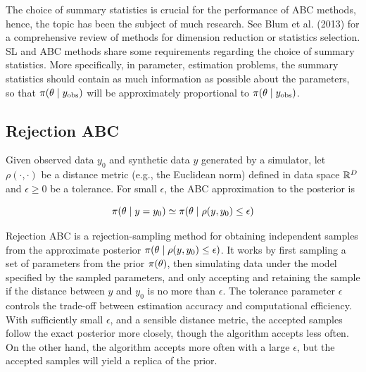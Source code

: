 The choice of summary statistics is crucial for the performance of ABC methods, hence, the topic has been the subject of much research. See Blum et al. (2013) for a comprehensive review of methods for dimension reduction or statistics selection. SL and ABC methods share some requirements regarding the choice of summary statistics. More specifically, in parameter, estimation problems, the summary statistics should contain as much information as possible about the parameters, so that $\pi \qty(\theta \mid y_\mathrm{obs})$ will be approximately proportional to $\pi \qty(\theta \mid y_\mathrm{obs})$. \cite{ABC_ch20} 

\subsection{Rejection ABC}\label{sec:rejection_abc}

Given observed data $y_0$ and synthetic data $y$ generated by a simulator, let $\rho (\cdot, \cdot)$ be a distance metric (e.g., the Euclidean norm) defined in data space $\mathbb{R}^D$ and $\epsilon \geq 0$ be a tolerance. For small $\epsilon$, the ABC approximation to the posterior is 

\begin{equation}
    \pi \qty(\theta \mid y=y_0) \simeq \pi \qty(\theta \mid \rho \qty(y, y_0) \leq \epsilon)
\end{equation}


Rejection ABC is a rejection-sampling method for obtaining independent samples from the approximate posterior $ \pi \qty(\theta \mid \rho \qty(y, y_0) \leq \epsilon)$. It works by first sampling a set of parameters from the prior $\pi \qty(\theta)$, then simulating data under the model specified by the sampled parameters, and only accepting and retaining the sample if the distance between $y$ and $y_0$ is no more than $\epsilon$. The tolerance parameter $\epsilon$ controls the trade-off between estimation accuracy and computational efficiency. With sufficiently small $\epsilon$, and a sensible distance metric, the accepted samples follow the exact posterior more closely, though the algorithm accepts less often. On the other hand, the algorithm accepts more often with a large $\epsilon$, but the accepted samples will yield a replica of the prior.

